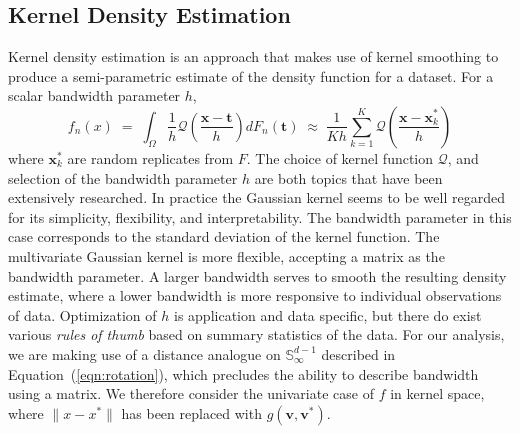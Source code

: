 \subsection{Kernel Density Estimation}
Kernel density estimation is an approach that makes use of 
    kernel smoothing to produce a semi-parametric estimate of the density
    function for a dataset.  For a scalar bandwidth parameter $h$,
    \[
        f_n(x) \;=\; 
            \int_{\Omega}\frac{1}{h}
                \mathcal{Q}\left(\frac{ \bm{x} - \bm{t}}{h}\right)dF_n(\bm{t}) 
            \;\approx\;
            \frac{1}{Kh}\sum_{k = 1}^K
                \mathcal{Q}\left(\frac{ \bm{x} - \bm{x}_k^{*}}{h}\right)
    \]
    where $\bm{x}_k^{*}$ are random replicates from $F$.  The choice of kernel function 
    $\mathcal{Q}$, and selection of the bandwidth parameter $h$ are both topics that have
    been extensively researched. In practice the Gaussian kernel seems to be 
    well regarded for its simplicity, flexibility, and interpretability.  The
    bandwidth parameter in this case corresponds to the standard deviation 
    of the kernel function.  The multivariate Gaussian kernel is more flexible,
    accepting a matrix as the bandwidth parameter.  A larger bandwidth serves 
    to smooth the resulting density estimate, where a lower bandwidth is more 
    responsive to individual observations of data.  Optimization of $h$ is 
    application and data specific, but there do exist various 
    \emph{rules of thumb} based on summary statistics of the data. For our 
    analysis, we are making use of a distance analogue on 
    $\mathbb{S}_{\infty}^{d-1}$ described in Equation~(\ref{eqn:rotation}), 
    which precludes the ability to describe bandwidth using a matrix.  We 
    therefore consider the univariate case of $f$ in kernel space, where 
    $\lVert x - x^*\rVert$ has been replaced with $g(\bm{v}, \bm{v}^*)$.

